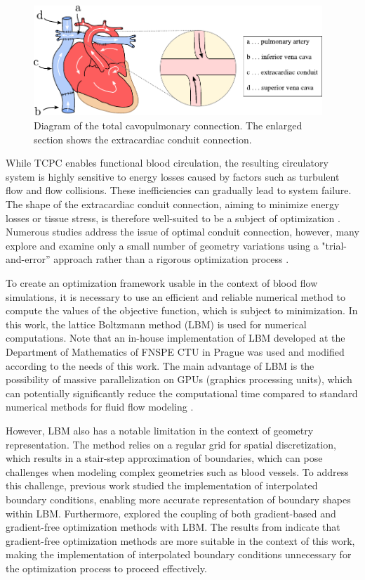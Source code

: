 \begin{figure}[h]
	\centering
	\includegraphics[width=0.97\textwidth]{figures/heart.pdf}
	\vspace{5mm}
	\caption{Diagram of the total cavopulmonary connection. The enlarged section shows the extracardiac conduit connection.}
	\label{fig:tcpc}

\end{figure}

While TCPC enables functional blood circulation, the resulting circulatory system is highly sensitive to energy losses caused by factors such as turbulent flow and flow collisions. These inefficiencies can gradually lead to system failure. The shape of the extracardiac conduit connection, aiming to minimize energy losses or tissue stress, is therefore well-suited to be a subject of optimization \cite{Chaloup, vanBake, Wang}. Numerous studies address the issue of optimal conduit connection, however, many explore and examine only a small number of geometry variations using a "trial-and-error” approach rather than a rigorous optimization process \cite{Rijnberg2018, Porfiryev2020, Tang2014}.

To create an optimization framework usable in the context of blood flow simulations, it is necessary to use an efficient and reliable numerical method to compute the values of the objective function, which is subject to minimization.  In this work, the lattice Boltzmann method (LBM) is used for numerical computations. Note that an in-house implementation of LBM developed at the Department of Mathematics of FNSPE CTU in Prague was used and modified according to the needs of this work. The main advantage of LBM is the possibility of massive parallelization on GPUs (graphics processing units), which can potentially significantly reduce the computational time compared to standard numerical methods for fluid flow modeling \cite{PE, Kruger}.

However, LBM also has a notable limitation in the context of geometry representation. The method relies on a regular grid for spatial discretization, which results in a stair-step approximation of boundaries, which can pose challenges when modeling complex geometries such as blood vessels. To address this challenge, previous work \cite{buresBP, buresVU} studied the implementation of interpolated boundary conditions, enabling more accurate representation of boundary shapes within LBM. Furthermore, \cite{buresVU} explored the coupling of both gradient-based and gradient-free optimization methods with LBM. The results from \cite{buresVU} indicate that gradient-free optimization methods are more suitable in the context of this work, making the implementation of interpolated boundary conditions unnecessary for the optimization process to proceed effectively.

